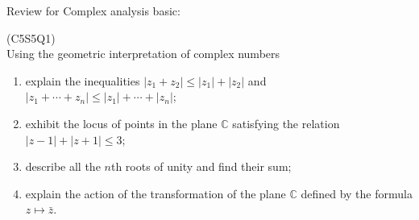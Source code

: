 Review for Complex analysis basic:
\begin{prb}
    (C5S5Q1) \\
    Using the geometric interpretation of complex numbers
    \begin{enumerate}
        \item[a)] explain the inequalities $|z_1 + z_2| \leq |z_1| + |z_2|$ and $|z_1 + \cdots + z_n| \leq |z_1| + \cdots + |z_n|$;
        \item[b)] exhibit the locus of points in the plane $\mathbb{C}$ satisfying the relation $|z - 1| + |z + 1| \leq 3$;
        \item[c)] describe all the $n$th roots of unity and find their sum;
        \item[d)] explain the action of the transformation of the plane $\mathbb{C}$ defined by the formula $z \mapsto \bar{z}$.
    \end{enumerate}
\end{prb}

